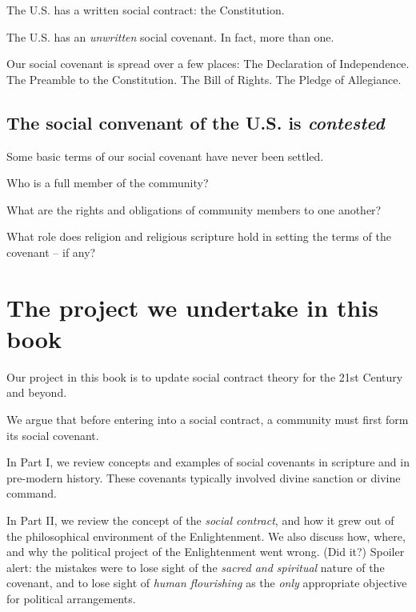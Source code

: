 \documentclass[
]{book}
\begin{document}
The U.S. has a written social contract: the Constitution.

The U.S. has an \emph{unwritten} social covenant. In fact, more than one.

Our social covenant is spread over a few places: The Declaration of Independence. The Preamble to the Constitution. The Bill of Rights. The Pledge of Allegiance.

\hypertarget{the-social-convenant-of-the-u.s.-is-contested}{%
\subsection{\texorpdfstring{The social convenant of the U.S. is \emph{contested}}{The social convenant of the U.S. is contested}}\label{the-social-convenant-of-the-u.s.-is-contested}}

Some basic terms of our social covenant have never been settled.

Who is a full member of the community?

What are the rights and obligations of community members to one another?

What role does religion and religious scripture hold in setting the terms of the covenant -- if any?

\hypertarget{the-project-we-undertake-in-this-book}{%
\section{The project we undertake in this book}\label{the-project-we-undertake-in-this-book}}

Our project in this book is to update social contract theory for the 21st Century and beyond.

We argue that before entering into a social contract, a community must first form its social covenant.

In Part I, we review concepts and examples of social covenants in scripture and in pre-modern history. These covenants typically involved divine sanction or divine command.

In Part II, we review the concept of the \emph{social contract}, and how it grew out of the philosophical environment of the Enlightenment. We also discuss how, where, and why the political project of the Enlightenment went wrong. (Did it?) Spoiler alert: the mistakes were to lose sight of the \emph{sacred and spiritual} nature of the covenant, and to lose sight of \emph{human flourishing} as the \emph{only} appropriate objective for political arrangements.
\end{document}
